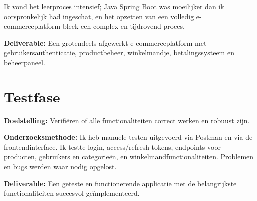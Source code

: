 Ik vond het leerproces intensief; Java Spring Boot was moeilijker dan ik oorspronkelijk had ingeschat, en het opzetten van een volledig e-commerceplatform bleek een complex en tijdrovend proces.

\textbf{Deliverable:} Een grotendeels afgewerkt e-commerceplatform met gebruikersauthenticatie, productbeheer, winkelmandje, betalingssysteem en beheerpaneel.

\section{Testfase}

\textbf{Doelstelling:} Verifiëren of alle functionaliteiten correct werken en robuust zijn.

\textbf{Onderzoeksmethode:} Ik heb manuele testen uitgevoerd via Postman en via de frontendinterface. Ik testte login, access/refresh tokens, endpoints voor producten, gebruikers en categorieën, en winkelmandfunctionaliteiten. Problemen en bugs werden waar nodig opgelost.

\textbf{Deliverable:} Een geteste en functionerende applicatie met de belangrijkste functionaliteiten succesvol geïmplementeerd.
